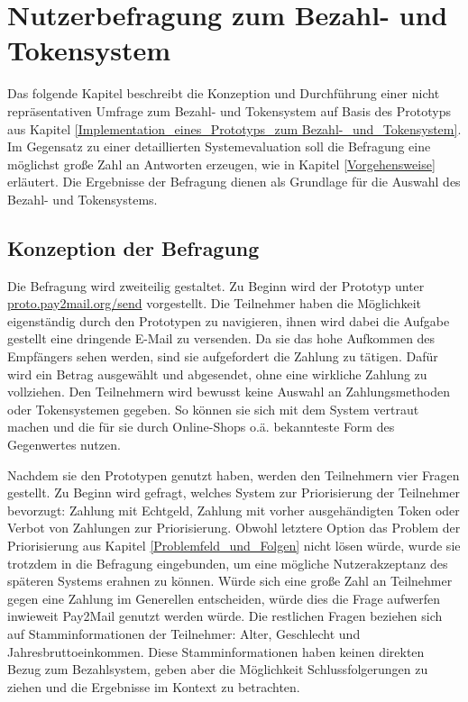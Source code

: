 
\chapter{Nutzerbefragung zum Bezahl- und Tokensystem}
\label{Nutzerbefragung_zum Bezahl-_und_Tokensystem}
Das folgende Kapitel beschreibt die Konzeption und Durchführung einer nicht repräsentativen Umfrage zum Bezahl- und Tokensystem auf Basis des Prototyps aus Kapitel \ref{Implementation_eines_Prototyps_zum Bezahl-_und_Tokensystem}. Im Gegensatz zu einer detaillierten Systemevaluation soll die Befragung eine möglichst große Zahl an Antworten erzeugen, wie in Kapitel \ref{Vorgehensweise} erläutert. Die Ergebnisse der Befragung dienen als Grundlage für die Auswahl des Bezahl- und Tokensystems.

\section{Konzeption der Befragung}
Die Befragung wird zweiteilig gestaltet. Zu Beginn wird der Prototyp unter \\ \url{proto.pay2mail.org/send} vorgestellt. Die Teilnehmer haben die Möglichkeit eigenständig durch den Prototypen zu navigieren, ihnen wird dabei die Aufgabe gestellt eine dringende E-Mail zu versenden. Da sie das hohe Aufkommen des Empfängers sehen werden, sind sie aufgefordert die Zahlung zu tätigen. Dafür wird ein Betrag ausgewählt und abgesendet, ohne eine wirkliche Zahlung zu vollziehen. Den Teilnehmern wird bewusst keine Auswahl an Zahlungsmethoden oder Tokensystemen gegeben. So können sie sich mit dem System vertraut machen und die für sie durch Online-Shops o.ä. bekannteste Form des Gegenwertes nutzen.

Nachdem sie den Prototypen genutzt haben, werden den Teilnehmern vier Fragen gestellt. Zu Beginn wird gefragt, welches System zur Priorisierung der Teilnehmer bevorzugt: Zahlung mit Echtgeld, Zahlung mit vorher ausgehändigten Token oder Verbot von Zahlungen zur Priorisierung. Obwohl letztere Option das Problem der Priorisierung aus Kapitel \ref{Problemfeld_und_Folgen} nicht lösen würde, wurde sie trotzdem in die Befragung eingebunden, um eine mögliche Nutzerakzeptanz des späteren Systems erahnen zu können. Würde sich eine große Zahl an Teilnehmer gegen eine Zahlung im Generellen entscheiden, würde dies die Frage aufwerfen inwieweit Pay2Mail genutzt werden würde. Die restlichen Fragen beziehen sich auf Stamminformationen der Teilnehmer: Alter, Geschlecht und Jahresbruttoeinkommen. Diese Stamminformationen haben keinen direkten Bezug zum Bezahlsystem, geben aber die Möglichkeit Schlussfolgerungen zu ziehen und die Ergebnisse im Kontext zu betrachten. 

